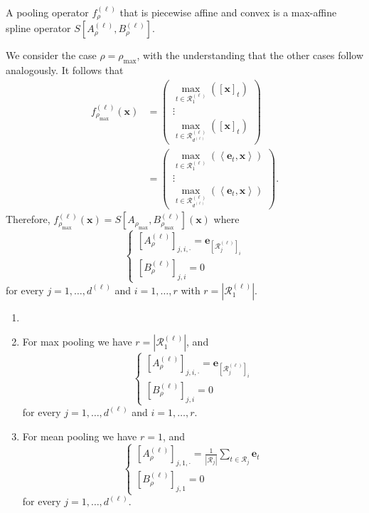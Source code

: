 \begin{proposition}
    A pooling operator $f_{\rho}^{(\ell)}$ that is piecewise affine and convex is a max-affine spline operator $S\left[A_{\rho}^{(\ell)},B_{\rho}^{(\ell)}\right]$.
\end{proposition}

\begin{tproof}
    We consider the case $\rho=\rho_{\max}$, with the understanding that the other cases follow analogously. It follows that
    \begin{align*}
        f^{(\ell)}_{\rho_{\max}}(\mathbf{x})&=\begin{pmatrix}\max_{t\in\mathcal{R}^{(\ell)}_1}\left([\mathbf{x}]_t\right)\\\vdots\\\max_{t\in\mathcal{R}^{(\ell)}_{d^{(\ell)}}}\left([\mathbf{x}]_t\right)\end{pmatrix}\\&=\begin{pmatrix}\max_{t\in\mathcal{R}^{(\ell)}_1}\left(\left\langle\mathbf{e}_t,\mathbf{x}\right\rangle\right)\\\vdots\\\max_{t\in\mathcal{R}^{(\ell)}_{d^{(\ell)}}}\left(\left\langle\mathbf{e}_t,\mathbf{x}\right\rangle\right)\end{pmatrix}.
    \end{align*}
    Therefore, $f^{(\ell)}_{\rho_{\max}}(\mathbf{x})=S\left[A_{\rho_{\max}},B^{(\ell)}_{\rho_{\max}}\right](\mathbf{x})$ where $$\begin{cases}\left[A_{\rho}^{(\ell)}\right]_{j,i,\cdot}=\mathbf{e}_{\left[\mathcal{R}^{(\ell)}_j\right]_i}\\\left[B_{\rho}^{(\ell)}\right]_{j,i}=0\end{cases}$$for every $j=1,\dots,d^{(\ell)}$ and $i=1,\dots,r$ with $r=\left\vert\mathcal{R}^{(\ell)}_1\right\vert$.
\end{tproof}

\begin{example}\label{eg:maso_pooling}
    \begin{enumerate}
        \item[]
        \item For max pooling we have $r=\left\vert\mathcal{R}^{(\ell)}_1\right\vert$, and $$\begin{cases}\left[A_{\rho}^{(\ell)}\right]_{j,i,\cdot}=\mathbf{e}_{\left[\mathcal{R}^{(\ell)}_j\right]_i}\\\left[B_{\rho}^{(\ell)}\right]_{j,i}=0\end{cases}$$for every $j=1,\dots,d^{(\ell)}$ and $i=1,\dots,r$.
        \item For mean pooling we have $r=1$, and $$\begin{cases}\left[A_{\rho}^{(\ell)}\right]_{j,1,\cdot}=\frac{1}{\left\vert\mathcal{R}_j\right\vert}\sum_{t\in\mathcal{R}_j}\mathbf{e}_t\\\left[B_{\rho}^{(\ell)}\right]_{j,1}=0\end{cases}$$for every $j=1,\dots,d^{(\ell)}$.
    \end{enumerate}
\end{example}

